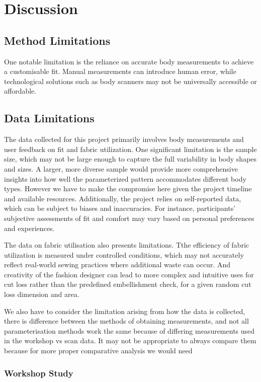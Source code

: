 \chapter{Discussion}

\section{Method Limitations}
One notable limitation is the reliance on accurate body measurements to achieve a customisable fit. Manual measurements can introduce human error, while technological solutions such as body scanners may not be universally accessible or affordable.

\section{Data Limitations}
The data collected for this project primarily involves body measurements and user feedback on fit and fabric utilization. One significant limitation is the sample size, which may not be large enough to capture the full variability in body shapes and sizes. A larger, more diverse sample would provide more comprehensive insights into how well the parameterized pattern accommodates different body types. However we have to make the compromise here given the project timeline and available resources. Additionally, the project relies on self-reported data, which can be subject to biases and inaccuracies. For instance, participants’ subjective assessments of fit and comfort may vary based on personal preferences and experiences. 

The data on fabric utilisation also presents limitations. Tthe efficiency of fabric utilization is measured under controlled conditions, which may not accurately reflect real-world sewing practices where additional waste can occur. And creativity of the fashion designer can lead to more complex and intuitive uses for cut loss rather than the predefined embellishment check, for a given random cut loss dimension and area.

We also have to consider the limitation arising from how the data is collected, there is difference between the methods of obtaining measurements, and not all parameterisation methods work the same because of differing measurements used in the workshop vs scan data. It may not be appropriate to always compare them because for more proper comparative analysis we would need 


\subsection{Workshop Study}

